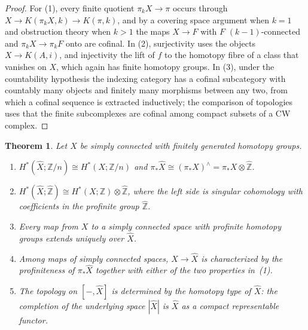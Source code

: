 \documentclass[11pt]{amsart}
\theoremstyle{plain}
\newtheorem{theorem}{Theorem}[section]
\theoremstyle{definition}
\numberwithin{equation}{section}
\newcommand{\Z}{\mathbb{Z}}
\newcommand{\Zhat}{\widehat{\mathbb{Z}}}
\newcommand{\hX}{\widehat{X}}
\begin{document}
\begin{proof}
For (1), every finite quotient $\pi_kX\to\pi$ occurs through $X\to K(\pi_kX,k)\to K(\pi,k)$, and by a covering space argument when $k=1$ and obstruction theory when $k>1$ the maps $X\to F$ with $F$ $(k-1)$-connected and $\pi_kX\to\pi_kF$ onto are cofinal.
In (2), surjectivity uses the objects $X\to K(A,i)$, and injectivity the lift of $f$ to the homotopy fibre of a class that vanishes on $X$, which again has finite homotopy groups.
In (3), under the countability hypothesis the indexing category has a cofinal subcategory with countably many objects and finitely many morphisms between any two, from which a cofinal sequence is extracted inductively; the comparison of topologies uses that the finite subcomplexes are cofinal among compact subsets of a CW complex.
\end{proof}

\begin{theorem}\label{thm:completionfg}
Let $X$ be simply connected with finitely generated homotopy groups.
\begin{enumerate}[label=\textup{(\arabic*)}]
\item $H^*(\hX;\Z/n)\cong H^*(X;\Z/n)$ and $\pi_*\hX\cong(\pi_*X)^\wedge=\pi_*X\otimes\Zhat$.
\item $H^*(\hX;\Zhat)\cong H^*(X;\Z)\otimes\Zhat$, where the left side is singular cohomology with coefficients in the profinite group $\Zhat$.
\item Every map from $X$ to a simply connected space with profinite homotopy groups extends uniquely over $\hX$.
\item Among maps of simply connected spaces, $X\to\hX$ is characterized by the profiniteness of $\pi_*\hX$ together with either of the two properties in~\textup{(1)}.
\item The topology on $[-,\hX]$ is determined by the homotopy type of $\hX$: the completion of the underlying space $|\hX|$ is $\hX$ as a compact representable functor.
\end{enumerate}
\end{theorem}
\end{document}
